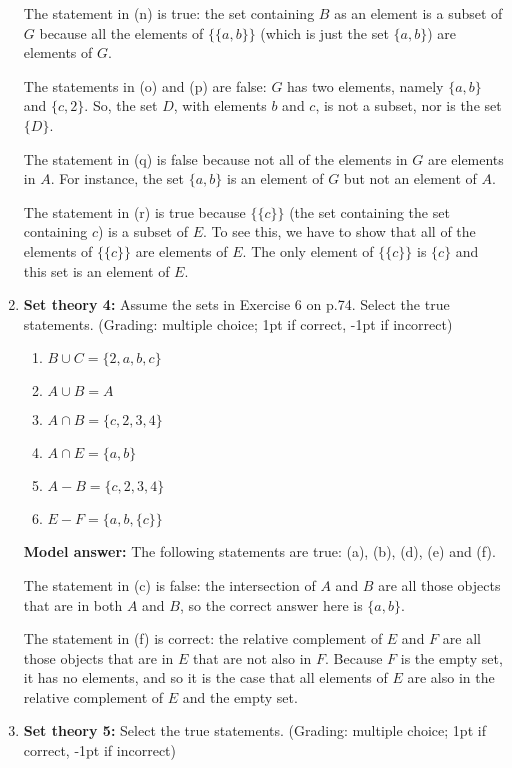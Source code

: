 \documentclass[a4,11pt]{article}
\begin{document}
\begin{enumerate}[leftmargin = 12pt]
The statement in (n) is true: the set containing $B$ as an element is a subset of $G$ because all the elements of $\{\{a,b\}\}$ (which is just the set $\{a,b\}$) are elements of $G$.

The statements in (o) and (p) are false: $G$ has two elements, namely $\{a,b\}$ and $\{c,2\}$. So, the set $D$, with elements $b$ and $c$, is not a subset, nor is the set $\{D\}$.

The statement in (q) is false because not all of the elements in $G$ are elements in $A$. For instance, the set $\{a,b\}$ is an element of $G$ but not an element of $A$.

The statement in (r) is true because $\{\{c\}\}$ (the set containing the set containing $c$) is a subset of $E$. To see this, we have to show that all of the elements of $\{\{c\}\}$ are elements of $E$. The only element of $\{\{c\}\}$ is $\{c\}$ and this set is an element of $E$.
 
 \item {\bf Set theory 4:} Assume the sets in Exercise 6 on p.74. Select the true statements.  (Grading: multiple choice; 1pt if correct, -1pt if incorrect)

      \begin{enumerate}[noitemsep]
        \item $B \cup C = \{2, a, b, c\} $
        \item $A \cup B = A $
	\item $A \cap B = \{c, 2, 3, 4\}$
	\item $A \cap E = \{a, b\} $
	\item $A - B = \{c, 2, 3, 4\} $
	\item $E - F = \{a , b, \{c\}\}$
         \end{enumerate}

 {\bf Model answer:} The following statements are true: (a), (b), (d), (e) and (f).
 
 The statement in (c) is false: the intersection of $A$ and $B$ are all those objects that are in both $A$ and $B$, so the correct answer here is $\{a, b\}$.
 
 The statement in (f) is correct: the relative complement of $E$ and $F$ are all those objects that are in $E$ that are not also in $F$. Because $F$ is the empty set, it has no elements, and so it is the case that all elements of $E$ are also in the relative complement of $E$ and the empty set.
 
 \item {\bf Set theory 5:} Select the true statements.  (Grading: multiple choice; 1pt if correct, -1pt if incorrect)


\end{enumerate}
\end{document}
